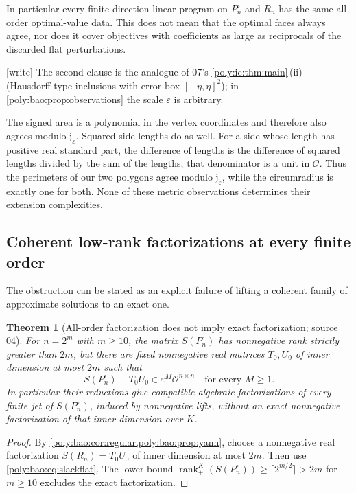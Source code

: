\documentclass[11pt,a4paper]{article}
\numberwithin{equation}{section}
\newtheorem{theorem}{Theorem}[section]
\theoremstyle{plain}
\newcommand{\wtag}{\textup{[write]}}%
\newcommand{\eps}{\varepsilon}
\newcommand{\OO}{\mathcal O}
\newcommand{\nrk}{\operatorname{rank}_{+}}
\newcommand{\JJ}{\mathfrak j}
\newcommand{\boxrad}[1]{[-#1,#1]^2}
\begin{document}
In particular every finite-direction linear program on $P^\circ_n$ and $R_n$
has the same all-order optimal-value data. This does not mean that the
optimal faces always agree, nor does it cover objectives with coefficients
as large as reciprocals of the discarded flat perturbations.

\wtag{} The second clause is the analogue of 07's
\cref{poly:ic:thm:main}\,(ii) (Hausdorff-type inclusions with error box
$\boxrad{\eta}$); in \cref{poly:bao:prop:observations} the scale $\eps$ is
arbitrary.

The signed area is a polynomial in the vertex coordinates and therefore
also agrees modulo $\JJ_\eps$. Squared side lengths do as well. For a side
whose length has positive real standard part, the difference of lengths
is the difference of squared lengths divided by the sum of the lengths;
that denominator is a unit in $\OO$. Thus the perimeters of our two
polygons agree modulo $\JJ_\eps$, while the circumradius is exactly one for
both. None of these metric observations determines their extension
complexities.

\subsection{Coherent low-rank factorizations at every finite order}
The obstruction can be stated as an explicit failure of lifting a
coherent family of approximate solutions to an exact one.

\begin{theorem}[All-order factorization does not imply exact factorization; source 04]
\label{poly:bao:thm:factorfailure}
For $n=2^m$ with $m\geq10$, the matrix $S(P^\circ_n)$ has nonnegative rank
strictly greater than $2m$, but there are fixed nonnegative real matrices
$T_0,U_0$ of inner dimension at most $2m$ such that
\[
 S(P^\circ_n)-T_0U_0\in\eps^M\OO^{n\times n}
 \quad\text{for every }M\geq1.
\]
In particular their reductions give compatible algebraic factorizations
of every finite jet of $S(P^\circ_n)$, induced by nonnegative lifts, without an
exact nonnegative factorization of that inner dimension over $K$.
\end{theorem}
\begin{proof}
By \cref{poly:bao:cor:regular,poly:bao:prop:yann}, choose a nonnegative real factorization
$S(R_n)=T_0U_0$ of inner dimension at most $2m$. Then use
\eqref{poly:bao:eq:slackflat}. The lower bound
$\nrk^K(S(P^\circ_n))\geq\lceil2^{m/2}\rceil>2m$ for $m\geq10$ excludes the
exact factorization.
\end{proof}
\end{document}
